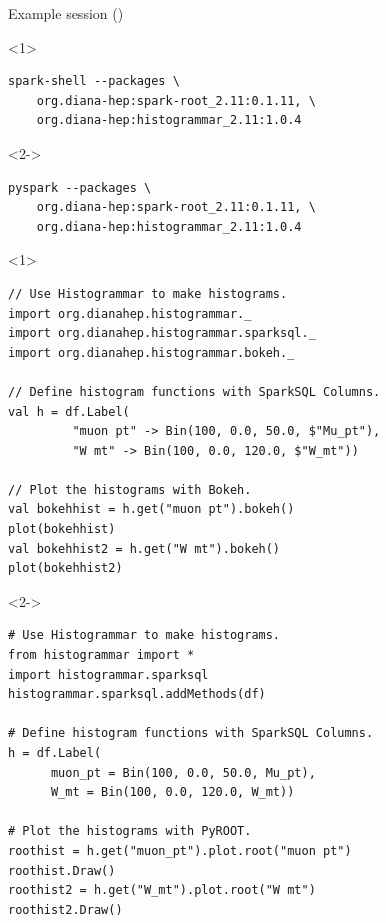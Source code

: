 \documentclass{beamer}
\begin{document}
\begin{frame}[fragile]{Example session ()}
\vspace{0.25 cm}
\small
\begin{onlyenv}<1>
\begin{verbatim}
spark-shell --packages \
    org.diana-hep:spark-root_2.11:0.1.11, \
    org.diana-hep:histogrammar_2.11:1.0.4
\end{verbatim}
\end{onlyenv}
\begin{onlyenv}<2->
\begin{verbatim}
pyspark --packages \
    org.diana-hep:spark-root_2.11:0.1.11, \
    org.diana-hep:histogrammar_2.11:1.0.4
\end{verbatim}
\end{onlyenv}
\small
\begin{onlyenv}<1>
\begin{verbatim}
// Use Histogrammar to make histograms.
import org.dianahep.histogrammar._
import org.dianahep.histogrammar.sparksql._
import org.dianahep.histogrammar.bokeh._

// Define histogram functions with SparkSQL Columns.
val h = df.Label(
         "muon pt" -> Bin(100, 0.0, 50.0, $"Mu_pt"),
         "W mt" -> Bin(100, 0.0, 120.0, $"W_mt"))

// Plot the histograms with Bokeh.
val bokehhist = h.get("muon pt").bokeh()
plot(bokehhist)
val bokehhist2 = h.get("W mt").bokeh()
plot(bokehhist2)
\end{verbatim}
\end{onlyenv}

\begin{onlyenv}<2->
\begin{verbatim}
# Use Histogrammar to make histograms.
from histogrammar import *
import histogrammar.sparksql
histogrammar.sparksql.addMethods(df)

# Define histogram functions with SparkSQL Columns.
h = df.Label(
      muon_pt = Bin(100, 0.0, 50.0, Mu_pt),
      W_mt = Bin(100, 0.0, 120.0, W_mt))

# Plot the histograms with PyROOT.
roothist = h.get("muon_pt").plot.root("muon pt")
roothist.Draw()
roothist2 = h.get("W_mt").plot.root("W mt")
roothist2.Draw()
\end{verbatim}
\end{onlyenv}


\end{frame}
\end{document}
